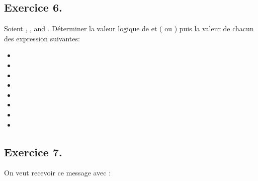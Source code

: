 \documentclass[letterpaper,10pt,french]{sphinxmanual}
\begin{document}
\subsection{Exercice 6.}
\label{\detokenize{exo1:exercice-6}}
\sphinxAtStartPar
Soient , , and . Déterminer la valeur logique de  et  ( ou ) puis la valeur de chacun des expression suivantes:
\begin{itemize}
\item {} 
\sphinxAtStartPar
{}

\item {} 
\sphinxAtStartPar
{}

\item {} 
\sphinxAtStartPar
{}

\item {} 
\sphinxAtStartPar
{}

\item {} 
\sphinxAtStartPar
{}

\item {} 
\sphinxAtStartPar
{}

\item {} 
\sphinxAtStartPar
{}

\item {} 
\sphinxAtStartPar
{}

\end{itemize}

\begin{sphinxVerbatim}[commandchars=\\\{\}]
\end{sphinxVerbatim}




\subsection{Exercice 7.}
\label{\detokenize{exo1:exercice-7}}
\sphinxAtStartPar
On veut recevoir ce message avec :
\end{document}
